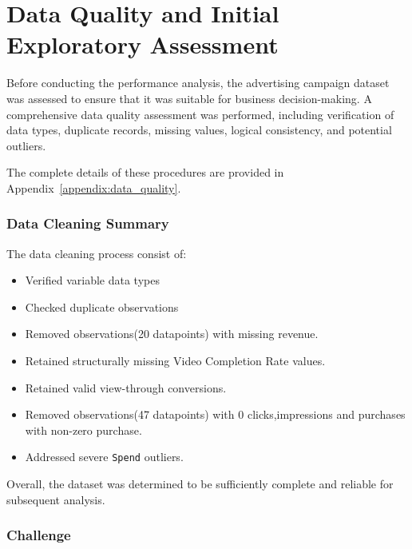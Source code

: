 \chapter{Data Quality and Initial Exploratory Assessment}

Before conducting the performance analysis, the advertising campaign dataset was assessed to ensure that it was suitable for business decision-making. A comprehensive data quality assessment was performed, including verification of data types, duplicate records, missing values, logical consistency, and potential outliers. 

The complete details of these procedures are provided in Appendix~\ref{appendix:data_quality}.

\subsection{Data Cleaning Summary}

The data cleaning process consist of:

\begin{itemize}
	\item Verified variable data types
	
	\item Checked duplicate observations
	
	\item Removed observations(20 datapoints) with missing revenue.
	
	\item Retained structurally missing Video Completion Rate values.
	
	\item Retained valid view-through conversions.
	
	\item Removed observations(47 datapoints) with 0 clicks,impressions and purchases with non-zero purchase. 
	
	\item Addressed severe \texttt{Spend} outliers.
	
	
	
	
\end{itemize}

Overall, the dataset was determined to be sufficiently complete and reliable for subsequent analysis.

\subsection{Challenge}


